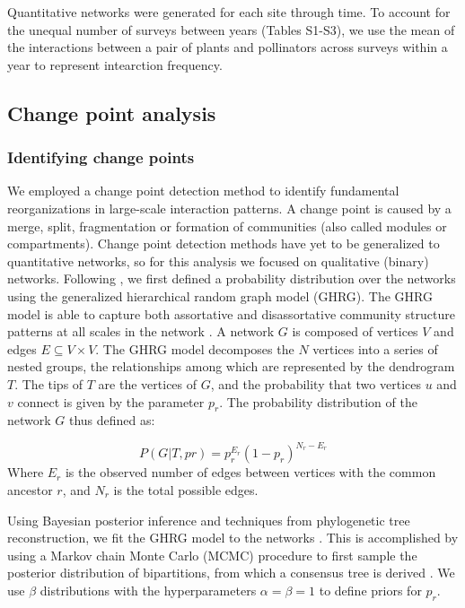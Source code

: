 \documentclass[12pt]{article}
\begin{document}
Quantitative networks were generated for each site through time. To
account for the unequal number of surveys between years (Tables
S1-S3), we use the mean of the interactions between a pair of plants
and pollinators across surveys within a year to represent intearction
frequency.

\subsection*{Change point analysis}
\subsubsection*{Identifying change points}
We employed a change point detection method \citep{peel2014detecting}
to identify fundamental reorganizations in large-scale interaction
patterns. A change point is caused by a merge, split, fragmentation or
formation of communities (also called modules or compartments). Change
point detection methods have yet to be generalized to quantitative
networks, so for this analysis we focused on qualitative (binary)
networks. Following \cite{peel2014detecting}, we first defined a
probability distribution over the networks using the generalized
hierarchical random graph model (GHRG). The GHRG model is able to
capture both assortative and disassortative community structure
patterns at all scales in the network \citep{peel2014detecting}. A
network $G$ is composed of vertices $V$ and edges $E \subseteq {V × V
}$. The GHRG model decomposes the $N$ vertices into a series of nested
groups, the relationships among which are represented by the
dendrogram $T$. The tips of $T$ are the vertices of $G$, and the
probability that two vertices $u$ and $v$ connect is given by the
parameter $p_r$. The probability distribution of the network $G$ thus
defined as:

\begin{equation}
  \label{eq:lik}
  P(G|T,{pr}) = p_r^{E_r}(1-p_r)^{N_r-E_r}
\end{equation}
% 
Where $E_r$ is the observed number of edges between vertices with the
common ancestor $r$, and $N_r$ is the total possible edges.

Using Bayesian posterior inference and techniques from phylogenetic
tree reconstruction, we fit the GHRG model to the networks
\citep{peel2014detecting}. This is accomplished by using a Markov
chain Monte Carlo (MCMC) procedure to first sample the posterior
distribution of bipartitions, from which a consensus tree is derived
\citep{peel2014detecting}. We use $\beta$ distributions with the
hyperparameters $\alpha=\beta=1$ to define priors for $p_r$.
\end{document}
